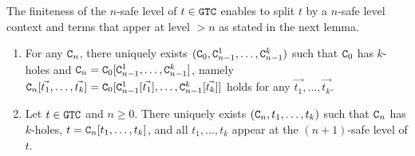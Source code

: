 The finiteness of the $n$-safe level of $t\in{\tt GTC}$ enables 
to split $t$ by a $n$-safe level context and terms that apper at level $>n$
as stated in the next lemma. 

\begin{lemma}\label{lem:split_context}
  \begin{enumerate}
  \item\label{lem:split_context1}
    For any ${\tt C}_{n}$, there uniquely exists
    $({\tt C}_{0},{\tt C}_{n-1}^{1},\ldots,{\tt C}_{n-1}^{k})$ such that
    ${\tt C}_{0}$ has $k$-holes and
    ${\tt C}_{n} = {\tt C}_{0}[{\tt C}_{n-1}^1,\ldots,{\tt C}_{n-1}^k]$, namely ${\tt C}_{n}[\vec{t_1},\ldots,\vec{t_k}] = {\tt C}_{0}[{\tt C}_{n-1}^1[\vec{t_1}],\ldots,{\tt C}_{n-1}^k[\vec{t_k}]]$ holds for any $\vec{t_1},\ldots,\vec{t_k}$. 
  \item\label{lem:split_context2}
    Let $t\in{\tt GTC}$ and $n\ge 0$.
    There uniquely exists $({\tt C}_{n},t_1,\ldots,t_k)$
    such that ${\tt C}_{n}$ has $k$-holes, $t = {\tt C}_{n}[t_1,\ldots,t_k]$,
    and all $t_1,\ldots,t_k$ appear at the $(n+1)$-safe level of $t$.
  \end{enumerate}
\end{lemma}
